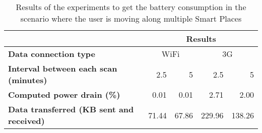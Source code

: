 \begin{table}[]
\centering
\begin{tabular}{@{}|l|r|r|r|r|@{}}
\toprule
{\bf }                                        & \multicolumn{4}{c|}{{\bf Results}}                  \\ \midrule
{\bf Data connection type}                    & \multicolumn{2}{c|}{WiFi} & \multicolumn{2}{c|}{3G} \\ \midrule
{\bf Interval between each scan (minutes)}    & 2.5         & 5           & 2.5         & 5         \\ \midrule
{\bf Computed power drain (\%)}               & 0.01        & 0.01        & 2.71        & 2.00      \\ \midrule
{\bf Data transferred (KB sent and received)} & 71.44       & 67.86       & 229.96      & 138.26    \\ \bottomrule
\end{tabular}
\caption{Results of the experiments to get the battery consumption in the scenario where the user is moving along multiple Smart Places}
\label{tab:results_battery_walking}
\end{table}
